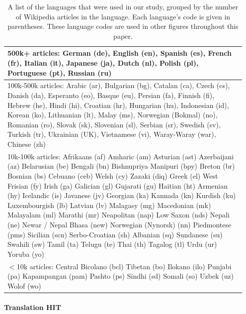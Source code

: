 \documentclass[11pt]{article}
\begin{document}
\begin{table}[h]
\scriptsize 
\begin{center}
\begin{tabular}{|p{0.95\linewidth}|}
\hline
{\sc 500k+ articles:} German (de), English (en), Spanish (es), French (fr), Italian (it), Japanese (ja), Dutch (nl), Polish (pl), Portuguese (pt), Russian (ru)\\
\hline
{\sc 100k-500k articles:} Arabic (ar), Bulgarian (bg), Catalan (ca), Czech (cs), Danish (da), Esperanto (eo), Basque (eu), Persian (fa), Finnish (fi), Hebrew (he), Hindi (hi), Croatian (hr), Hungarian (hu), Indonesian (id), Korean (ko), Lithuanian (lt), Malay (ms), Norwegian (Bokmal) (no), Romanian (ro), Slovak (sk), Slovenian (sl), Serbian (sr), Swedish (sv), Turkish (tr), Ukrainian (UK), Vietnamese (vi), Waray-Waray (war), Chinese (zh)\\
\hline
{\sc 10k-100k articles:}
Afrikaans (af) Amharic (am) Asturian (ast) Azerbaijani (az) Belarusian (be) Bengali (bn) Bishnupriya Manipuri (bpy) Breton (br) Bosnian (bs) Cebuano (ceb) Welsh (cy) Zazaki (diq) Greek (el) West Frisian (fy) Irish (ga) Galician (gl) Gujarati (gu) Haitian (ht) Armenian (hy) Icelandic (is) Javanese (jv) Georgian (ka) Kannada (kn) Kurdish (ku) Luxembourgish (lb) Latvian (lv) Malagasy (mg) Macedonian (mk) Malayalam (ml) Marathi (mr) Neapolitan (nap) Low Saxon (nds) Nepali (ne) Newar / Nepal Bhasa (new) Norwegian (Nynorsk) (nn) Piedmontese (pms) Sicilian (scn) Serbo-Croatian (sh) Albanian (sq) Sundanese (su) Swahili (sw) Tamil (ta) Telugu (te) Thai (th) Tagalog (tl) Urdu (ur) Yoruba (yo)\\ 
\hline
{\sc $<$10k articles:} Central Bicolano (bcl) Tibetan (bo) Ilokano (ilo) Punjabi (pa) Kapampangan (pam) Pashto (ps) Sindhi (sd) Somali (so) Uzbek (uz) Wolof (wo)\\

\hline
\end{tabular}
\end{center}
\normalsize
\caption{A list of the languages that were used in our study, grouped by the number of Wikipedia articles in the language.  Each language's code is given in parentheses.  These language codes are used in other figures throughout this paper.}\label{Wikipedia-buckets}
\end{table}%


\paragraph{Translation HIT}
\end{document}
